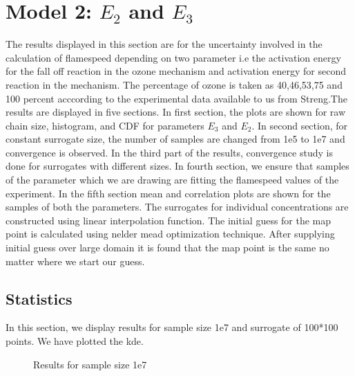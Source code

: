 \section{Model 2: $E_2$ and $E_3$}

The results displayed in this section are for the uncertainty involved in the calculation of flamespeed depending  on two parameter i.e the activation energy for the fall off reaction in the ozone mechanism and activation energy for second reaction in the mechanism. The percentage of ozone is taken as 40,46,53,75 and 100  percent acccording to the experimental data available to us from Streng\cite{Streng}.The results are displayed in five sections. In first section, the plots are shown for raw chain size, histogram, and CDF for parameters $E_3$ and $E_2$. In second section, for constant surrogate size, the number of samples are changed from 1e5 to 1e7 and convergence is observed. In the third part of the results, convergence study is done for surrogates with different sizes. In fourth section, we ensure that samples of the parameter which we are drawing are fitting the flamespeed values of the experiment. In the fifth section mean and correlation plots are shown for the samples of both the parameters. The surrogates for individual concentrations are constructed using linear interpolation function. The initial guess for the map point is calculated using nelder mead optimization technique. After supplying initial guess over large domain it is found that the map point is the same no matter where we start our guess.


\subsection{ Statistics }

 In this section, we display results for sample size 1e7 and surrogate of 100*100 points. We  have plotted the kde.

\begin{figure}[H]
\centering
{}
    \caption{Results for sample size 1e7}
\end{figure}

